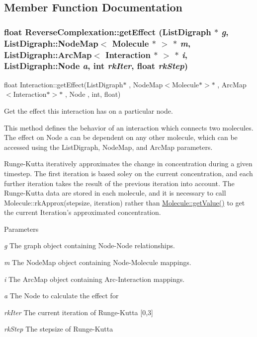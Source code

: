\subsection{Member Function Documentation}
\hypertarget{classReverseComplexation_a9dceec2b67efbe7c14a7e53c959263f5}{
\subsubsection[{getEffect}]{\setlength{\rightskip}{0pt plus 5cm}float ReverseComplexation::getEffect (ListDigraph $\ast$ {\em g}, \/  ListDigraph::NodeMap$<$ {\bf Molecule} $\ast$ $>$ $\ast$ {\em m}, \/  ListDigraph::ArcMap$<$ {\bf Interaction} $\ast$ $>$ $\ast$ {\em i}, \/  ListDigraph::Node {\em a}, \/  int {\em rkIter}, \/  float {\em rkStep})}}
\label{classReverseComplexation_a9dceec2b67efbe7c14a7e53c959263f5}
float Interaction::getEffect(ListDigraph$\ast$ , NodeMap$<$Molecule$\ast$$>$$\ast$ , ArcMap$<$Interaction$\ast$$>$$\ast$ , Node , int, float)

Get the effect this interaction has on a particular node.

This method defines the behavior of an interaction which connects two molecules. The effect on Node a can be dependent on any other molecule, which can be accessed using the ListDigraph, NodeMap, and ArcMap parameters.

Runge-\/Kutta iteratively approximates the change in concentration during a given timestep. The first iteration is based soley on the current concentration, and each further iteration takes the result of the previous iteration into account. The Runge-\/Kutta data are stored in each molecule, and it is necessary to call Molecule::rkApprox(stepsize, iteration) rather than \hyperlink{classMolecule_a554ea822918374775d5f52b5d49d8195}{Molecule::getValue()} to get the current Iteration's approximated concentration.


\begin{DoxyParams}{Parameters}
\item[{\em g}]The graph object containing Node-\/Node relationships. \item[{\em m}]The NodeMap object containing Node-\/Molecule mappings. \item[{\em i}]The ArcMap object containing Arc-\/Interaction mappings. \item[{\em a}]The Node to calculate the effect for \item[{\em rkIter}]The current iteration of Runge-\/Kutta \mbox{[}0,3\mbox{]} \item[{\em rkStep}]The stepsize of Runge-\/Kutta \end{DoxyParams}


